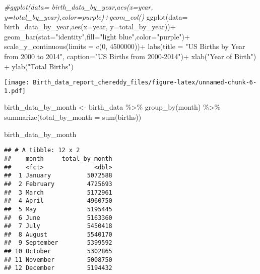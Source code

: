 \documentclass[
]{article}
\newenvironment{Shaded}{\begin{snugshade}}{\end{snugshade}}
\newcommand{\AttributeTok}[1]{\textcolor[rgb]{0.77,0.63,0.00}{#1}}
\newcommand{\CommentTok}[1]{\textcolor[rgb]{0.56,0.35,0.01}{\textit{#1}}}
\newcommand{\DecValTok}[1]{\textcolor[rgb]{0.00,0.00,0.81}{#1}}
\newcommand{\FunctionTok}[1]{\textcolor[rgb]{0.00,0.00,0.00}{#1}}
\newcommand{\NormalTok}[1]{#1}
\newcommand{\OtherTok}[1]{\textcolor[rgb]{0.56,0.35,0.01}{#1}}
\newcommand{\SpecialCharTok}[1]{\textcolor[rgb]{0.00,0.00,0.00}{#1}}
\newcommand{\StringTok}[1]{\textcolor[rgb]{0.31,0.60,0.02}{#1}}
\begin{document}
\begin{Shaded}
\begin{Highlighting}[]
\CommentTok{\#ggplot(data= birth\_data\_by\_year,aes(x=year, y=total\_by\_year),color=purple)+geom\_col()}
\FunctionTok{ggplot}\NormalTok{(}\AttributeTok{data=}\NormalTok{ birth\_data\_by\_year,}\FunctionTok{aes}\NormalTok{(}\AttributeTok{x=}\NormalTok{year, }\AttributeTok{y=}\NormalTok{total\_by\_year))}\SpecialCharTok{+}
  \FunctionTok{geom\_bar}\NormalTok{(}\AttributeTok{stat=}\StringTok{"identity"}\NormalTok{,}\AttributeTok{fill=}\StringTok{"light blue"}\NormalTok{,}\AttributeTok{color=}\StringTok{"purple"}\NormalTok{)}\SpecialCharTok{+}
  \FunctionTok{scale\_y\_continuous}\NormalTok{(}\AttributeTok{limits =} \FunctionTok{c}\NormalTok{(}\DecValTok{0}\NormalTok{, }\DecValTok{4500000}\NormalTok{))}\SpecialCharTok{+}
  \FunctionTok{labs}\NormalTok{(}\AttributeTok{title =} \StringTok{"US Births by Year from 2000 to 2014"}\NormalTok{,}
       \AttributeTok{caption=}\StringTok{"US Births from 2000{-}2014"}\NormalTok{)}\SpecialCharTok{+}
  \FunctionTok{xlab}\NormalTok{(}\StringTok{"Year of Birth"}\NormalTok{) }\SpecialCharTok{+}
  \FunctionTok{ylab}\NormalTok{(}\StringTok{"Total Births"}\NormalTok{)}
\end{Highlighting}
\end{Shaded}

\texttt{[image: Birth\_data\_report\_chereddy\_files/figure-latex/unnamed-chunk-6-1.pdf]}

\begin{Shaded}
\begin{Highlighting}[]
\NormalTok{birth\_data\_by\_month }\OtherTok{\textless{}{-}}\NormalTok{ birth\_data }\SpecialCharTok{\%\textgreater{}\%} 
  \FunctionTok{group\_by}\NormalTok{(month) }\SpecialCharTok{\%\textgreater{}\%} 
  \FunctionTok{summarize}\NormalTok{(}\AttributeTok{total\_by\_month =} \FunctionTok{sum}\NormalTok{(births))}

\NormalTok{birth\_data\_by\_month}
\end{Highlighting}
\end{Shaded}

\begin{verbatim}
## # A tibble: 12 x 2
##    month     total_by_month
##    <fct>              <dbl>
##  1 January          5072588
##  2 February         4725693
##  3 March            5172961
##  4 April            4960750
##  5 May              5195445
##  6 June             5163360
##  7 July             5450418
##  8 August           5540170
##  9 September        5399592
## 10 October          5302865
## 11 November         5008750
## 12 December         5194432
\end{verbatim}
\end{document}
